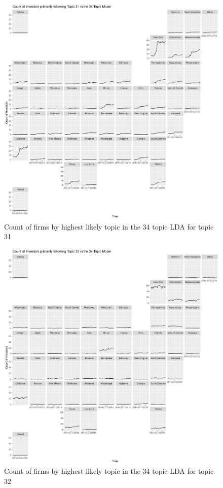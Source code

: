 \begin{figure}
	\centering
	\includegraphics[width=1\linewidth]{Figures/ChapterV/USA_34_Topic31.pdf}
	\caption[Count of Firms for Topic 31 by Quarter]{Count of firms by highest likely topic in the 34 topic LDA for topic 31}
	\label{fig:StateLDA31}
\end{figure}

\begin{figure}
	\centering
	\includegraphics[width=1\linewidth]{Figures/ChapterV/USA_34_Topic32.pdf}
	\caption[Count of Firms for Topic 32 by Quarter]{Count of firms by highest likely topic in the 34 topic LDA for topic 32}
	\label{fig:StateLDA32}
\end{figure}

